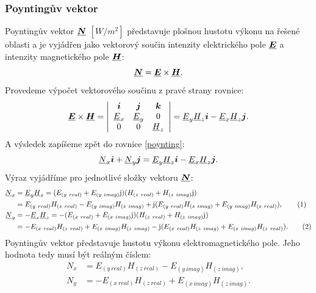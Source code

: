 \documentclass[12pt,a4paper,oneside]{article}
\numberwithin{equation}{section} %
\numberwithin{figure}{section} %
\numberwithin{table}{section} %
\newcommand{\mj}{\mathrm{j}} %
\renewcommand{\vec}[1]{\mbox{\boldmath$#1$}} %
\newcommand{\faz}[1]{{\underline{#1}}} %
\newcommand\numberthis{\addtocounter{equation}{1}\tag{\theequation}}
\begin{document}
\subsubsection{Poyntingův vektor}
Poyntingův vektor $\faz{\vec{N}}$ $[W / m ^2]$ představuje plošnou hustotu výkonu na řešené oblasti a je vyjádřen jako vektorový součin intenzity elektrického pole $\faz{\vec{E}}$ a intenzity magnetického pole $\faz{\vec{H}}$:
\begin{equation}
\label{poynting}
\faz{\vec{N}} = \faz{\vec{E}} \times \faz{\vec{H}} .
\end{equation}
Provedeme výpočet vektorového součinu z pravé strany rovnice:
\begin{equation}
\faz{\vec{E}} \times \faz{\vec{H}} =
\left| 
\begin{array}{c c c}
\vec{i} & \vec{j} & \vec{k} \\ 
\faz{E} _x & \faz{E} _y & 0 \\
0 & 0 & \faz{H} _z
\end{array}
\right|
= \faz{E} _y \faz{H} _z \vec{i} - \faz{E} _x \faz{H} _z \vec{j} .
\end{equation}
A výsledek zapíšeme zpět do rovnice \ref{poynting}:
\begin{equation}
\faz{N} _x \vec{i} + \faz{N} _y \vec{j} = \faz{E} _y \faz{H} _z \vec{i} - \faz{E} _x \faz{H} _z \vec{j} .
\end{equation}
Výraz vyjádříme pro jednotlivé složky vektoru $\faz{\vec{N}}$:
\begin{subequations}
\begin{align*}
\faz{N} _x &= \faz{E} _y \faz{H} _z = (E _{(y~real)} + E _{(y~imag)} \mj) (H _{(z~real)} + H _{(z~imag)} \mj) 
\\
&= E _{(y~real)} H _{(z~real)} - E _{(y~imag)} H _{(z~imag)} + \mj (E _{(y~real)} H _{(z~imag)} + E _{(y~imag)} H _{(z~real)}) ,
\numberthis
\\
\faz{N} _y &= - \faz{E} _x \faz{H} _z = - (E _{(x~real)} + E _{(x~imag)} \mj) (H _{(z~real)} + H _{(z~imag)} \mj)
\\ 
&= - E _{(x~real)} H _{(z~real)} + E _{(x~imag)} H _{(z~imag)} - \mj (E _{(x~real)} H _{(z~imag)} + E _{(x~imag)} H _{(z~real)}) .
\numberthis
\end{align*}
\end{subequations}
Poyntingův vektor představuje hustotu výkonu elektromagnetického pole. Jeho hodnota tedy musí být reálným číslem:
\begin{subequations}
\begin{align}
N _x &= E _{(y~real)} H _{(z~real)} - E _{(y~imag)} H _{(z~imag)} ,
\\
N _y &= - E _{(x~real)} H _{(z~real)} + E _{(x~imag)} H _{(z~imag)} .
\end{align}
\end{subequations}
\end{document}
